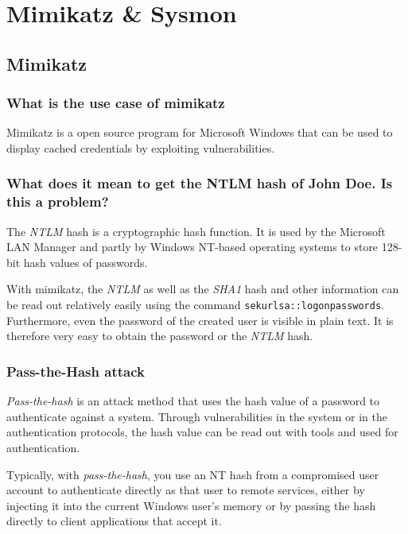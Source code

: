 

\section{Mimikatz \& Sysmon}

\subsection{Mimikatz}

\subsubsection{What is the use case of mimikatz}
Mimikatz is a open source program for Microsoft Windows that can be used to display cached credentials by exploiting vulnerabilities.

\subsubsection{What does it mean to get the NTLM hash of John Doe. Is this a problem?}
The \textit{NTLM} hash is a cryptographic hash function. It is used by the Microsoft LAN Manager and partly by Windows NT-based operating systems to store 128-bit hash values of passwords.

With mimikatz, the \textit{NTLM} as well as the \textit{SHA1} hash and other information can be read out relatively easily using the command \lstinline|sekurlsa::logonpasswords|. Furthermore, even the password of the created user is visible in plain text.
It is therefore very easy to obtain the password or the \textit{NTLM} hash.

\subsubsection{Pass-the-Hash attack}
\textit{Pass-the-hash} is an attack method that uses the hash value of a password to authenticate against a system. Through vulnerabilities in the system or in the authentication protocols, the hash value can be read out with tools and used for authentication.

Typically, with \textit{pass-the-hash}, you use an NT hash from a compromised user account to authenticate directly as that user to remote services, either by injecting it into the current Windows user's memory or by passing the hash directly to client applications that accept it.

